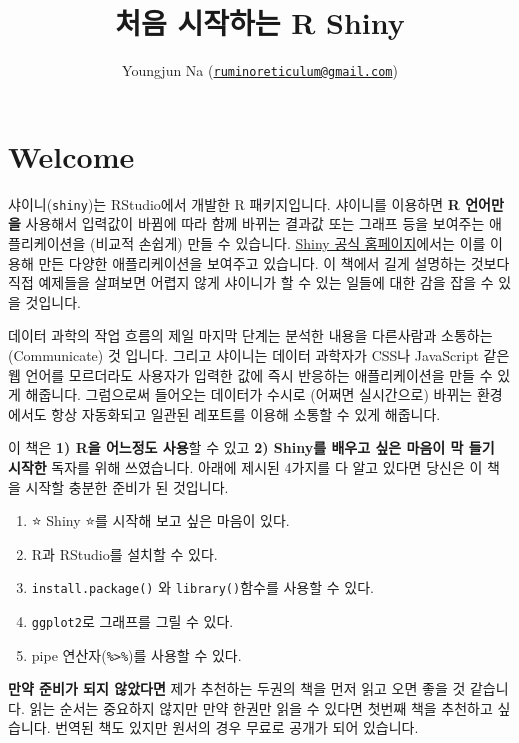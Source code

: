 \documentclass[]{book}
\title{처음 시작하는 R Shiny}
\author{Youngjun Na
(\href{mailto:ruminoreticulum@gmail.com}{\nolinkurl{ruminoreticulum@gmail.com}})}
\date{}
\providecommand{\tightlist}{%
  \setlength{\itemsep}{0pt}\setlength{\parskip}{0pt}}
\begin{document}
\maketitle

{
\setcounter{tocdepth}{1}
\tableofcontents
}
\chapter*{Welcome}\label{welcome}

샤이니(\texttt{shiny})는 RStudio에서 개발한 R 패키지입니다. 샤이니를
이용하면 \textbf{R 언어만을} 사용해서 입력값이 바뀜에 따라 함께 바뀌는
결과값 또는 그래프 등을 보여주는 애플리케이션을 (비교적 손쉽게) 만들 수
있습니다. \href{https://shiny.rstudio.com/gallery/}{Shiny 공식
홈페이지}에서는 이를 이용해 만든 다양한 애플리케이션을 보여주고
있습니다. 이 책에서 길게 설명하는 것보다 직접 예제들을 살펴보면 어렵지
않게 샤이니가 할 수 있는 일들에 대한 감을 잡을 수 있을 것입니다.

데이터 과학의 작업 흐름의 제일 마지막 단계는 분석한 내용을 다른사람과
소통하는 (Communicate) 것 입니다. 그리고 샤이니는 데이터 과학자가 CSS나
JavaScript 같은 웹 언어를 모르더라도 사용자가 입력한 값에 즉시 반응하는
애플리케이션을 만들 수 있게 해줍니다. 그럼으로써 들어오는 데이터가
수시로 (어쩌면 실시간으로) 바뀌는 환경에서도 항상 자동화되고 일관된
레포트를 이용해 소통할 수 있게 해줍니다.

이 책은 \textbf{1) R을 어느정도 사용}할 수 있고 \textbf{2) Shiny를
배우고 싶은 마음이 막 들기 시작한} 독자를 위해 쓰였습니다. 아래에 제시된
4가지를 다 알고 있다면 당신은 이 책을 시작할 충분한 준비가 된 것입니다.

\begin{enumerate}
\def\labelenumi{\arabic{enumi}.}
\setcounter{enumi}{-1}
\tightlist
\item
  ⭐ Shiny ⭐를 시작해 보고 싶은 마음이 있다.
\item
  R과 RStudio를 설치할 수 있다.
\item
  \texttt{install.package()} 와 \texttt{library()}함수를 사용할 수 있다.
\item
  \texttt{ggplot2}로 그래프를 그릴 수 있다.
\item
  pipe 연산자(\texttt{\%\textgreater{}\%})를 사용할 수 있다.
\end{enumerate}

\textbf{만약 준비가 되지 않았다면} 제가 추천하는 두권의 책을 먼저 읽고
오면 좋을 것 같습니다. 읽는 순서는 중요하지 않지만 만약 한권만 읽을 수
있다면 첫번째 책을 추천하고 싶습니다. 번역된 책도 있지만 원서의 경우
무료로 공개가 되어 있습니다.
\end{document}
